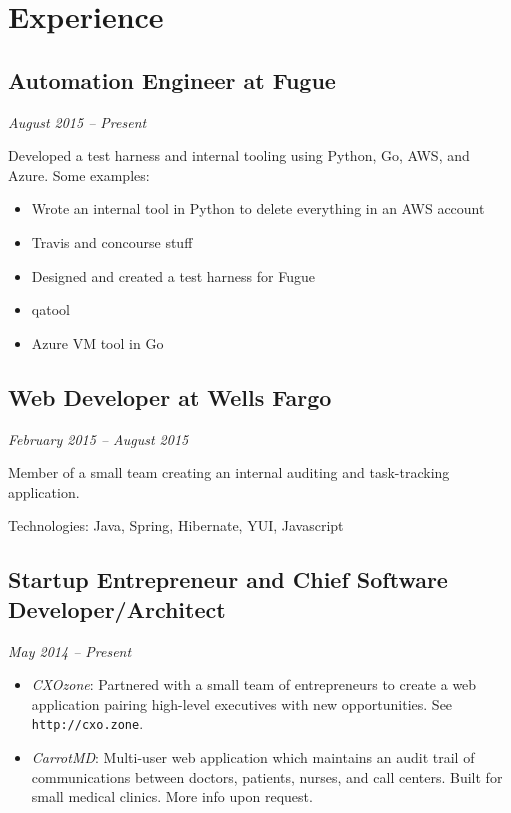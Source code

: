 \documentclass[a4paper,11pt]{article}
\begin{document}
\vspace{-9pt}
\section*{Experience}

\subsection*{Automation Engineer at Fugue}
\vskip -20pt
\hfill \textit{August 2015 -- Present}

Developed a test harness and internal tooling using Python, Go, AWS, and Azure.
Some examples:

\begin{itemize}
\item Wrote an internal tool in Python to delete everything in an AWS account
\item Travis and concourse stuff
\item Designed and created a test harness for Fugue
\item qatool
\item Azure VM tool in Go
\end{itemize}

\subsection*{Web Developer at Wells Fargo}
\vskip -20pt
\hfill \textit{February 2015 -- August 2015}

Member of a small team creating an internal auditing and task-tracking application.

Technologies: Java, Spring, Hibernate, YUI, Javascript

\subsection*{Startup Entrepreneur and Chief Software Developer/Architect}
\vskip -20pt
\hfill \textit{May 2014 -- Present}

\begin{itemize}

  \vskip 5pt
  \item \textit{CXOzone}: Partnered with a small team of entrepreneurs to create a web application
    pairing high-level executives with new opportunities. See \texttt{http://cxo.zone}.

  \item \textit{CarrotMD}: Multi-user web application which maintains an audit trail of
    communications between doctors, patients, nurses, and call centers. Built for small medical
    clinics. More info upon request.

\end{itemize}
\end{document}

